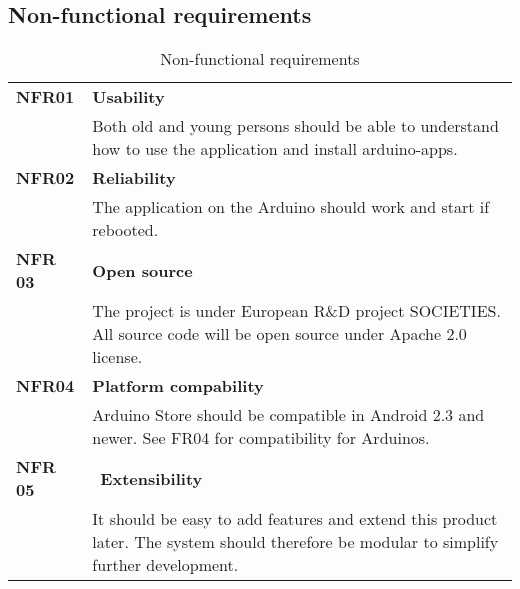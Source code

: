 \subsection{Non-functional requirements}
\begin{table}[H]
\begin{tabular}{ll}
{\bf NFR01} & {\bf Usability}\\
 & Both old and young persons should be able to understand how to use the application and install arduino-apps.\\
{\bf NFR02} & {\bf Reliability}\\
 & The application on the Arduino should work and start if rebooted.\\
{\bf NFR 03} & {\bf Open source}\\
 & The project is under European R\&D project SOCIETIES. All source code will be open source under Apache 2.0 license.\\
{\bf NFR04} & {\bf Platform compability}\\
 & Arduino Store should be compatible in Android 2.3 and newer. See FR04 for compatibility for Arduinos.\\
{\bf NFR 05} & {\bf Extensibility}\\
 & It should be easy to add features and extend this product later. The system should therefore be modular to simplify further development.\\
\end{tabular}
\caption{Non-functional requirements}
\end{table}